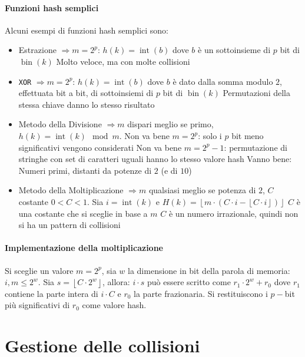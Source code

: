         \paragraph{Funzioni hash semplici}
            Alcuni esempi di funzioni hash semplici sono:
            \begin{itemize}
                \item Estrazione $\Rightarrow m=2^p$: $h(k) = \operatorname{int}(b)$ dove $b$ è un sottoinsieme di $p$ bit di $\operatorname{bin}(k)$
                    \subitem Molto veloce, ma con molte collisioni
                \item \texttt{XOR} $\Rightarrow m=2^p$: $h(k) = \operatorname{int}(b)$ dove $b$ è dato dalla somma modulo $2$, effettuata bit a bit, di sottoinsiemi di $p$ bit di $\operatorname{bin}(k)$
                    \subitem Permutazioni della stessa chiave danno lo stesso risultato
                \item Metodo della Divisione $\Rightarrow m$ dispari meglio se primo, $h(k) = \operatorname{int}(k)\mod m$.
                    \subitem Non va bene $m=2^p$: solo i $p$ bit meno significativi vengono considerati
                    \subitem Non va bene $m=2^p-1$: permutazione di stringhe con set di caratteri uguali hanno lo stesso valore hash
                    \subitem Vanno bene: Numeri primi, distanti da potenze di $2$ (e di $10$)
                \item Metodo della Moltiplicazione $\Rightarrow m$ qualsiasi meglio se potenza di $2$, $C$ costante $0<C<1$. Sia $i=\operatorname{int}(k)$ e $H(k)=\left\lfloor m\cdot (C\cdot i - \left\lfloor C\cdot i \right\rfloor) \right\rfloor$
                    \subitem $C$ è una costante che si sceglie in base a $m$
                    \subitem $C$ è un numero irrazionale, quindi non si ha un pattern di collisioni
            \end{itemize}
            \paragraph{Implementazione della moltiplicazione} Si sceglie un valore $m=2^p$, sia $w$ la dimensione in bit della parola di memoria: $i,m\leq 2^w$. Sia $s=\left\lfloor C\cdot 2^w \right\rfloor$, allora: $i\cdot s$ può essere scritto come $r_1\cdot 2^w + r_0$ dove $r_1$ contiene la parte intera di $i\cdot C$ e $r_0$ la parte frazionaria. \newline
            Si restituiscono i $p-$bit più significativi di $r_0$ come valore hash.
\section{Gestione delle collisioni}
